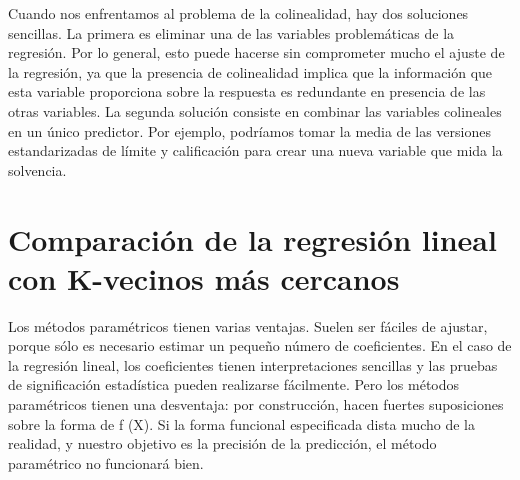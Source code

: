  Cuando nos enfrentamos al problema de la colinealidad, hay dos soluciones sencillas. La primera es eliminar una de las variables problemáticas de la regresión. Por lo general, esto puede hacerse sin comprometer mucho el ajuste de la regresión, ya que la presencia de colinealidad implica que la información que esta variable proporciona sobre la respuesta es redundante en presencia de las otras variables. La segunda solución consiste en combinar las variables colineales en un único predictor. Por ejemplo, podríamos tomar la media de las versiones estandarizadas de límite y calificación para crear una nueva variable que mida la solvencia.


 \section{Comparación de la regresión lineal con K-vecinos más cercanos}
 Los métodos paramétricos tienen varias ventajas. Suelen ser fáciles de ajustar, porque sólo es necesario estimar un pequeño número de coeficientes. En el caso de la regresión lineal, los coeficientes tienen interpretaciones sencillas y las pruebas de significación estadística pueden realizarse fácilmente. Pero los métodos paramétricos tienen una desventaja: por construcción, hacen fuertes suposiciones sobre la forma de f (X). Si la forma funcional especificada dista mucho de la realidad, y nuestro objetivo es la precisión de la predicción, el método paramétrico no funcionará bien.\\
 
